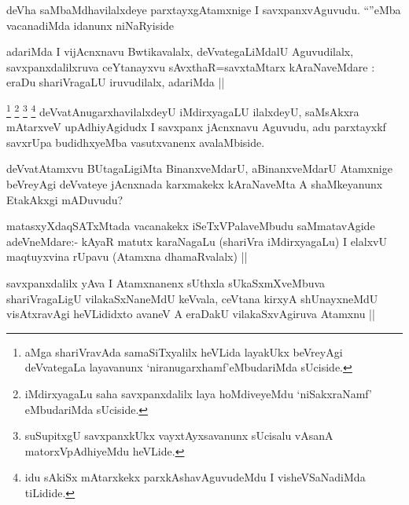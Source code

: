 \begin{artha}
deVha saMbaMdhavilalxdeye parxtayxgAtamxnige I savxpanxvAguvudu. ``\stext''eMba vacanadiMda idanunx niNaRyiside
\end{artha}


\begin{artha}
adariMda I vijAcnxnavu Bwtikavalalx, deVvategaLiMdalU Aguvudilalx, savxpanxdalilxruva ceYtanayxvu sAvxthaR=savxtaMtarx kAraNaveMdare : eraDu shariVragaLU iruvudilalx, adariMda ||
\end{artha}

\begin{artha}
\footnote{aMga shariVravAda samaSiTxyalilx heVLida layakUkx beVreyAgi deVvategaLa layavanunx `niranugarxhamf'eMbudariMda sUciside.}
\footnote{iMdirxyagaLu saha savxpanxdalilx laya hoMdiveyeMdu `niSakxraNamf' eMbudariMda sUciside.}
\footnote{suSupitxgU savxpanxkUkx vayxtAyxsavanunx sUcisalu vAsanA matorxVpAdhiyeMdu heVLide.}
\footnote{idu sAkiSx mAtarxkekx parxkAshavAguvudeMdu I visheVSaNadiMda tiLidide.}
deVvatAnugarxhavilalxdeyU iMdirxyagaLU ilalxdeyU, saMsAkxra mAtarxveV upAdhiyAgidudx I savxpanx jAcnxnavu Aguvudu, adu parxtayxkf savxrUpa budidhxyeMba vasutxvanenx avalaMbiside.
\end{artha}


\begin{artha}
deVvatAtamxvu BUtagaLigiMta BinanxveMdarU, aBinanxveMdarU Atamxnige beVreyAgi deVvateye jAcnxnada karxmakekx kAraNaveMta A shaMkeyanunx EtakAkxgi mADuvudu?
\end{artha}


\begin{artha}
matasxyXdaqSATxMtada vacanakekx iSeTxVPalaveMbudu saMmatavAgide adeVneMdare:- kAyaR matutx karaNagaLu (shariVra iMdirxyagaLu) I elalxvU maqtuyxvina rUpavu (Atamxna dhamaRvalalx) ||
\end{artha}

\begin{artha}
savxpanxdalilx yAva I Atamxnanenx sUthxla sUkaSxmXveMbuva shariVragaLigU vilakaSxNaneMdU keVvala, ceVtana kirxyA shUnayxneMdU visAtxravAgi heVLididxto avaneV A eraDakU vilakaSxvAgiruva Atamxnu || 
\end{artha}

